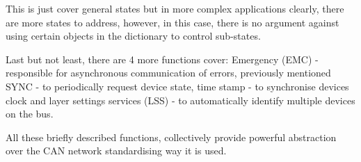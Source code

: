 This is just cover general states but in more complex applications clearly, there are more states to address, however, in this case, there is no argument against using certain objects in the dictionary to control sub-states.

Last but not least, there are 4 more functions cover: Emergency (EMC) - responsible for asynchronous communication of errors, previously mentioned SYNC - to periodically request device state, time stamp - to synchronise devices clock and layer settings services (LSS) - to automatically identify multiple devices on the bus.

All these briefly described functions, collectively provide powerful abstraction over the CAN network standardising way it is used.

\cite{CAN_CIA,CANOpen_NIKHEF,CANOpen_solutions,CANOpen_microcontrol}
\\ \\ \\ \\ \\ \\ 



